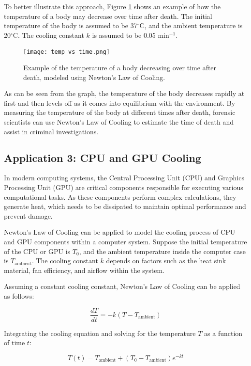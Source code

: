 \documentclass[12pt, a4paper]{article}
\begin{document}
To better illustrate this approach, Figure \ref{fig:temp_vs_time} shows an example of how the temperature of a body may decrease over time after death. The initial temperature of the body is assumed to be 37$^\circ$C, and the ambient temperature is 20$^\circ$C. The cooling constant $k$ is assumed to be 0.05 min$^{-1}$.

\begin{figure}[htbp]
\centering
\texttt{[image: temp\_vs\_time.png]}
\caption{Example of the temperature of a body decreasing over time after death, modeled using Newton's Law of Cooling.}
\label{fig:temp_vs_time}
\end{figure}

As can be seen from the graph, the temperature of the body decreases rapidly at first and then levels off as it comes into equilibrium with the environment. By measuring the temperature of the body at different times after death, forensic scientists can use Newton's Law of Cooling to estimate the time of death and assist in criminal investigations.

\subsection{Application 3: CPU and GPU Cooling}
In modern computing systems, the Central Processing Unit (CPU) and Graphics Processing Unit (GPU) are critical components responsible for executing various computational tasks. As these components perform complex calculations, they generate heat, which needs to be dissipated to maintain optimal performance and prevent damage.

Newton's Law of Cooling can be applied to model the cooling process of CPU and GPU components within a computer system. Suppose the initial temperature of the CPU or GPU is $T_0$, and the ambient temperature inside the computer case is $T_{\text{ambient}}$. The cooling constant $k$ depends on factors such as the heat sink material, fan efficiency, and airflow within the system.

Assuming a constant cooling constant, Newton's Law of Cooling can be applied as follows:

\begin{equation}
\frac{dT}{dt} = -k(T - T_{\text{ambient}})
\end{equation}

Integrating the cooling equation and solving for the temperature $T$ as a function of time $t$:

\begin{equation}
T(t) = T_{\text{ambient}} + (T_0 - T_{\text{ambient}}) e^{-kt}
\end{equation}
\end{document}
